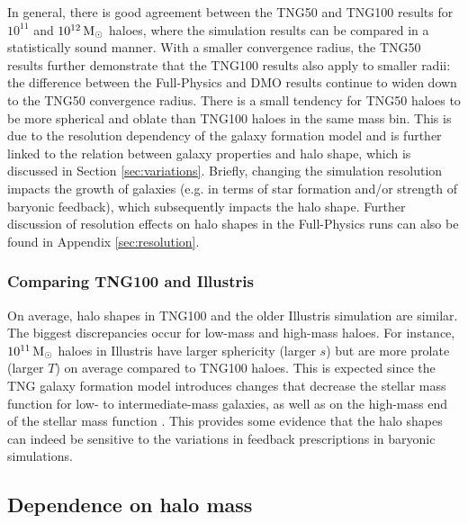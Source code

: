\documentclass[fleqn,usenatbib]{mnras}
\def\msun{\,\rm M_{\odot}}
\begin{document}
In general, there is good agreement between the TNG50 and TNG100 results for $10^{11}$ and $10^{12} \msun$ haloes, where the simulation results can be compared in a statistically sound manner.
With a smaller convergence radius, the TNG50 results further demonstrate that the TNG100 results also apply to smaller radii:
the difference between the Full-Physics and DMO results continue to widen down to the TNG50 convergence radius.
There is a small tendency for TNG50 haloes to be more spherical and oblate than TNG100 haloes in the same mass bin.
This is due to the resolution dependency of the galaxy formation model \citep[see e.g. Appendix sections of][]{Pillepich18v473, Pillepich18v475, Pillepich19v490} and is further linked to the relation between galaxy properties and halo shape, which is discussed in Section \ref{sec:variations}.
Briefly, changing the simulation resolution impacts the growth of galaxies (e.g. in terms of star formation and/or strength of baryonic feedback), which subsequently impacts the halo shape.
Further discussion of resolution effects on halo shapes in the Full-Physics runs can also be found in Appendix \ref{sec:resolution}.


\subsubsection*{Comparing TNG100 and Illustris}

On average, halo shapes in TNG100 and the older Illustris simulation are similar.
The biggest discrepancies occur for low-mass and high-mass haloes.
For instance,  $10^{11} \msun$ haloes in  Illustris have larger sphericity (larger $s$) but are more prolate (larger $T$) on average compared to TNG100 haloes.
This is expected since the TNG galaxy formation model introduces changes that decrease the stellar mass function for low- to intermediate-mass galaxies, as well as on the high-mass end of the stellar mass function \cite{Pillepich18v473, Weinberger17v465, Springel17v475}.
This provides some evidence that the halo shapes can indeed be sensitive to the variations in feedback prescriptions in baryonic simulations.



\subsection{Dependence on halo mass}
\label{sec:halo mass}
\end{document}
